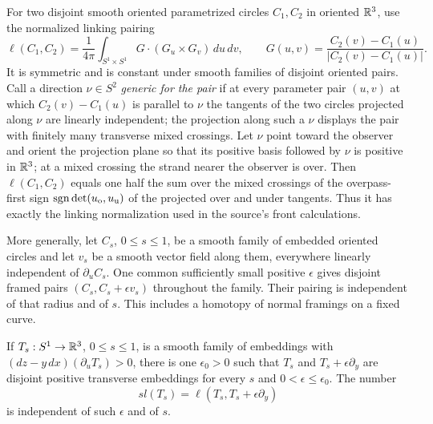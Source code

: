 \begin{lemma}
\label{fd:linking-calculus}
For two disjoint smooth oriented parametrized circles $C_1,C_2$ in
oriented $\mathbb R^3$, use the normalized linking pairing
\begin{equation}\label{fd:gauss-linking}
 \ell(C_1,C_2)=\frac1{4\pi}\int_{S^1\times S^1}
       G\cdot(G_u\times G_v)\,du\,dv,
 \qquad G(u,v)=\frac{C_2(v)-C_1(u)}{|C_2(v)-C_1(u)|}.
\end{equation}
It is symmetric and is constant under smooth families of disjoint
oriented pairs. Call a direction $\nu\in S^2$ \emph{generic for the pair} if at
every parameter pair $(u,v)$ at which $C_2(v)-C_1(u)$ is parallel to $\nu$
the tangents of the two circles projected along $\nu$ are linearly
independent; the projection along such a $\nu$ displays the pair with
finitely many transverse mixed crossings. Let $\nu$ point toward the
observer and orient the projection plane so that its positive basis followed
by $\nu$ is positive in $\mathbb R^3$; at a mixed crossing the strand nearer the
observer is over. Then $\ell(C_1,C_2)$ equals one half the sum over the
mixed crossings of the overpass-first sign $\operatorname{sgn}\det(u_{\rm o},u_{\rm u})$
of the projected over and under tangents.
Thus it has exactly the linking normalization used in the source's
front calculations.

More generally, let $C_s$, $0\leq s\leq1$, be a smooth family of embedded oriented
circles and let $v_s$ be a smooth vector field along them, everywhere
linearly independent of $\partial_uC_s$. One common sufficiently small
positive $\epsilon$ gives disjoint framed pairs
$(C_s,C_s+\epsilon v_s)$ throughout the family. Their pairing is
independent of that radius and of $s$. This includes a homotopy of
normal framings on a fixed curve.

If $T_s:S^1\to\mathbb R^3$, $0\leq s\leq1$, is a smooth family of
embeddings with $(dz-y\,dx)(\partial_uT_s)>0$, there is one
$\epsilon_0>0$ such that $T_s$ and $T_s+\epsilon\partial_y$ are
disjoint positive transverse embeddings for every $s$ and
$0<\epsilon\leq\epsilon_0$. The number
\begin{equation}\label{fd:framed-linking}
            sl(T_s)=\ell(T_s,T_s+\epsilon\partial_y)
\end{equation}
is independent of such $\epsilon$ and of $s$.
\end{lemma}
